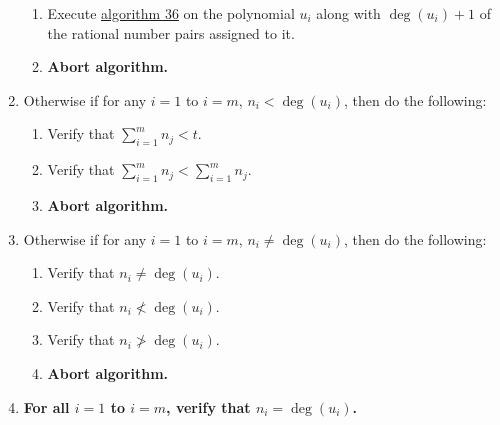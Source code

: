 \documentclass[twocolumn]{article}
\begin{document}
\begin{enumerate}
				\begin{enumerate}
					\item Execute \hyperref[sec:algorithm 36]{algorithm 36} on the polynomial $u_i$ along with $\deg(u_i)+1$ of the rational number pairs assigned to it.
					\item \textbf{Abort algorithm.}
				\end{enumerate}
				\item Otherwise if for any $i=1$ to $i=m$, $n_i<\deg(u_i)$, then do the following:
				\begin{enumerate}
					\item Verify that $\sum_{i=1}^m n_j<t$.
					\item Verify that $\sum_{i=1}^m n_j<\sum_{i=1}^m n_j$.
					\item \textbf{Abort algorithm.}
				\end{enumerate}
				\item Otherwise if for any $i=1$ to $i=m$, $n_i\ne\deg(u_i)$, then do the following:
				\begin{enumerate}
					\item Verify that $n_i\ne\deg(u_i)$.
					\item Verify that $n_i\nless\deg(u_i)$.
					\item Verify that $n_i\ngtr\deg(u_i)$.
					\item \textbf{Abort algorithm.}
				\end{enumerate}
				\item \textbf{For all $i=1$ to $i=m$, verify that $n_i=\deg(u_i)$.}
			\end{enumerate}
\end{document}
